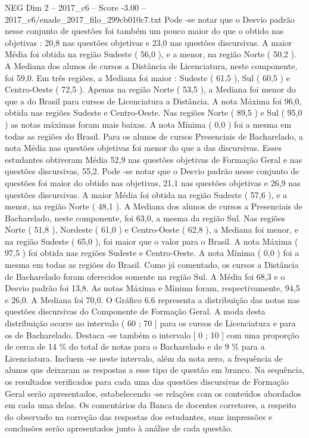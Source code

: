 \begin{textsample}{NEG Dim 2 – 2017\_c6 – Score -3.00 – 2017\_c6/enade\_2017\_filo\_299cb010c7.txt}
Pode -se notar que o Desvio padrão nesse conjunto de questões foi também um pouco maior do que o obtido nas objetivas : 20,8 nas questões objetivas e 23,0 nas questões discursivas.
A maior Média foi obtida na região Sudeste ( 56,0 ), e a menor, na região Norte ( 50,2 ).
A Mediana dos alunos de cursos a Distância de Licenciatura, neste componente, foi 59,0.
Em três regiões, a Mediana foi maior : Sudeste ( 61,5 ), Sul ( 60,5 ) e Centro-Oeste ( 72,5 ).
Apenas na região Norte ( 53,5 ), a Mediana foi menor do que a do Brasil para cursos de Licenciatura a Distância.
A nota Máxima foi 96,0, obtida nas regiões Sudeste e Centro-Oeste.
Nas regiões Norte ( 89,5 ) e Sul ( 95,0 ) as notas máximas foram mais baixas.
A nota Mínima ( 0,0 ) foi a mesma em todas as regiões do Brasil.
Para os alunos de cursos Presenciais de Bacharelado, a nota Média nas questões objetivas foi menor do que a das discursivas.
Esses estudantes obtiveram Média 52,9 nas questões objetivas de Formação Geral e nas questões discursivas, 55,2.
Pode -se notar que o Desvio padrão nesse conjunto de questões foi maior do obtido nas objetivas, 21,1 nas questões objetivas e 26,9 nas questões discursivas.
A maior Média foi obtida na região Sudeste ( 57,6 ), e a menor, na região Norte ( 48,1 ).
A Mediana dos alunos de cursos a Presenciais de Bacharelado, neste componente, foi 63,0, a mesma da região Sul.
Nas regiões Norte ( 51,8 ), Nordeste ( 61,0 ) e Centro-Oeste ( 62,8 ), a Mediana foi menor, e na região Sudeste ( 65,0 ), foi maior que o valor para o Brasil.
A nota Máxima ( 97,5 ) foi obtida nas regiões Sudeste e Centro-Oeste.
A nota Mínima ( 0,0 ) foi a mesma em todas as regiões do Brasil.
Como já comentado, os cursos a Distância de Bacharelado foram oferecidos somente na região Sul.
A Média foi 68,3 e o Desvio padrão foi 13,8.
As notas Máxima e Mínima foram, respectivamente, 94,5 e 26,0.
A Mediana foi 70,0.
O Gráfico 6.6 representa a distribuição das notas nas questões discursivas do Componente de Formação Geral.
A moda desta distribuição ocorre no intervalo ( 60 ; 70 ] para os cursos de Licenciatura e para os de Bacharelado.
Destaca -se também o intervalo [ 0 ; 10 ] com uma proporção de cerca de 14 \% do total de notas para o Bacharelado e de 9 \% para a Licenciatura.
Incluem -se neste intervalo, além da nota zero, a frequência de alunos que deixaram as respostas a esse tipo de questão em branco.
Na sequência, os resultados verificados para cada uma das questões discursivas de Formação Geral serão apresentados, estabelecendo -se relações com os conteúdos abordados em cada uma delas.
Os comentários da Banca de docentes corretores, a respeito do observado na correção das respostas dos estudantes, suas impressões e conclusões serão apresentados junto à análise de cada questão.

\end{textsample}
